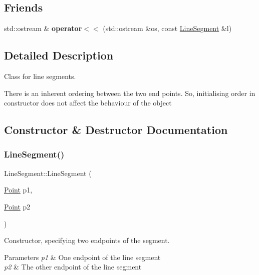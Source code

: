 \subsection*{Friends}
\begin{DoxyCompactItemize}
\item 
\mbox{\label{classLineSegment_aa6fe02d7d9f8ce3a0da5f6008b607850}} 
std\+::ostream \& {\bfseries operator$<$$<$} (std\+::ostream \&os, const \hyperlink{classLineSegment}{Line\+Segment} \&l)
\end{DoxyCompactItemize}


\subsection{Detailed Description}
Class for line segments. 

There is an inherent ordering between the two end points. So, initialising order in constructor does not affect the behaviour of the object 

\subsection{Constructor \& Destructor Documentation}
\mbox{\label{classLineSegment_a691e185edf3aa7e2dc12307f9ef4be6b}} 
\subsubsection{\texorpdfstring{Line\+Segment()}{LineSegment()}}
{\footnotesize\ttfamily Line\+Segment\+::\+Line\+Segment (\begin{DoxyParamCaption}\item[{\hyperlink{classPoint}{Point}}]{p1,  }\item[{\hyperlink{classPoint}{Point}}]{p2 }\end{DoxyParamCaption})}



Constructor, specifying two endpoints of the segment. 


\begin{DoxyParams}{Parameters}
{\em p1} & One endpoint of the line segment \\
\hline
{\em p2} & The other endpoint of the line segment \\
\hline
\end{DoxyParams}


